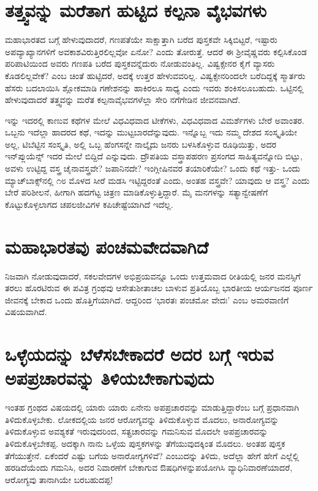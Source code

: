 \section*{ತತ್ತ್ವವನ್ನು ಮರೆತಾಗ ಹುಟ್ಟಿದ ಕಲ್ಪನಾ ವೈಭವಗಳು}

ಮಹಾಭಾರತದ ಬಗ್ಗೆ ಹೇಳುವುದಾದರೆ, ಗಣಪತೆಯೇ ಸಾಕ್ಷಾತ್ತಾಗಿ ಬರೆದ ಪುಸ್ತಕವೇ ಸಿಕ್ಕಿಬಿಟ್ಟರೆ, ಇಷ್ಟಾರು ಅಪವ್ಯಾಖ್ಯಾನಗಳಿಗೆ ಅವಕಾಶವಿರುತ್ತಿರಲಿಲ್ಲವೋ ಏನೋ? ಎಂದು ತೋರುತ್ತೆ. ಆದರೆ ಈ ಶ್ರೀವೈಷ್ಣವರು ಕಲ್ಪಿಸಿಕೊಂಡ ಪರಿಪಾಟಿಯಿಂದ ಅವರು ಗಣಪತಿ ಬರೆದ ಪುಸ್ತಕವನ್ನೆದುರು ನೋಡುವಂತಿಲ್ಲ. ವಿಷ್ವಕ್ಸೇನರ ಕೈಗೆ ವ್ಯಾಸರು ಕೊಡಲಿಲ್ಲವೇಕೆ? ಎಂಬ ಚಿಂತೆ ಹುಟ್ಟಿದರೆ, ಅದಕ್ಕೆ ಉತ್ತರ ಹೇಳುವವರಿಲ್ಲ. ವಿಷ್ವಕ್ಸೇನರಿಂದಲೇ ಬರೆದಿದ್ದಕ್ಕೆ ಸ್ಮಾರ್ತರು ಹೆಸರು ಬದಲಾಯಿಸಿ ಶ್ಲೋಕಮಾಡಿ ಗಣೇಶನನ್ನು ಹಾಕಿರಲೂ ಸಾಧ್ಯ ಎಂದು ಇವರು ಶಂಕಿಸಲೂಬಹುದು. ಒಟ್ಟಿನಲ್ಲಿ ಹೇಳುವುದಾದರೆ ತತ್ತ್ವವನ್ನು ಮರೆತ ಕಲ್ಪನಾವೈಭವಗಳೆಲ್ಲಾ ಸೇರಿ ನಗೆಗೇಡಿನ ಜೀವನವಾಗಿದೆ.

ಇನ್ನು ಇದರಲ್ಲಿ ಕಾಣುವ ಕಥೆಗಳ ಮೇಲೆ ವಿಧವಿಧವಾದ ಟೀಕೆಗಳು, ವಿಧವಿಧವಾದ ವಿಮರ್ಶೆಗಳು ಬೇರೆ ಅವಾಂತರ. ಒಬ್ಬನು ಇದೆಲ್ಲಾ ಹಾದರದ ಕಥೆ, ಇದನ್ನು ಮುಟ್ಟಬಾರದೆನ್ನುವುದು. ಇನ್ನೊಬ್ಬ ಇದು ನಮ್ಮ ದೇಶದ ಸಂಸ್ಕೃತಿಯೇ ಅಲ್ಲ, ಟಿಬೆಟ್ಟಿನ ಸಂಸ್ಕೃತಿ, ಅಲ್ಲಿ ಒಬ್ಬ ಹೆಂಗಸನ್ನೇ ನಾಲ್ಕೈದು ಜನರು ಬಳಸಿಕೊಳ್ಳುವ ರೂಢಿಯಿತ್ತು, ಅದರ ಇನ್‌ಪ್ಲುಯೆನ್ಸ್ ಇದರ ಮೇಲೆ ಬಿದ್ದಿದೆ ಎನ್ನುವುದು. ದ್ರೌಪತಿಯ ವಸ್ತ್ರಾಪಹರಣ ಪ್ರಸಂಗದ ಸಾಹಿತ್ಯವನ್ನೋದಿ ಬಿಟ್ಟು, ಅವಳು ಉಟ್ಟಿದ್ದ ವಸ್ತ್ರ ಚೈನಾವಸ್ತ್ರವೇ? ಜಪಾನಿನದೇ? ಇಂಗ್ಲೀಷಿನವರ ತಯಾರಿಕೆಯೇ? ಒಂದು ಕಥೆ ಇತ್ತು- ಒಂದು ಮ್ಯಾಚ್‌ಬಾಕ್ಸ್‌ನಲ್ಲಿ ೧೮ ಮೊಳದ ಸೀರೆ ಮಡಸಿ ಇಟ್ಟಿದ್ದರಂತೆ ಎಂದು, ಅಂತಹ ವಸ್ತ್ರವೇ? ಯಾವುದು ಆ ವಸ್ತ್ರ? ಎಂದು ಬೇರೆ ಪರಿಶೀಲನೆ, ಹೀಗಾಗಿ ಹದಗೆಟ್ಟ ಚಿತ್ರಣ ಮಾಡಿಕೊಳ್ಳುತ್ತಿದ್ದಾರೆ. ಮೈ ಮನಗಳನ್ನು ಸತ್ಯಾನ್ವೇಷಣೆಗೆ ಕೊಟ್ಟುಕೊಳ್ಳಲಾಗದ ಚಪಲಜೀವಿಗಳ ಕಪಿಚೇಷ್ಟೆಯಾಗಿದೆ ಇದೆಲ್ಲ.

\section*{ಮಹಾಭಾರತವು ಪಂಚಮವೇದವಾಗಿದೆ}

ನಿಜವಾಗಿ ನೋಡುವುದಾದರೆ, ಸಕಲವೇದಗಳ ಅಭಿಪ್ರಯವನ್ನೂ ಒಂದು ಉತ್ತಮವಾದ ರೀತಿಯಲ್ಲಿ ಜನರ ಮನಸ್ಸಿಗೆ ತರಲು ಹೊರಟಿರುವ ಈ ಪವಿತ್ರ ಗ್ರಂಥವು ಆಸೇತುಶೀತಾಚಲ ಬಾಳುವ ಪ್ರತಿಯೊಬ್ಬ ಭಾರತೀಯ ಆರ್ಯಜನದ ಪೂರ್ಣ ಜೀವನಕ್ಕೆ ಬೇಕಾದ ಒಂದು ಹೊತ್ತಿಗೆಯಾಗಿದೆ. ಆದ್ದರಿಂದ `ಭಾರತಃ ಪಂಚಮೋ ವೇದಃ' ಎಂಬ ಅಮರವಾಣಿಗೆ ವಿಷಯವಾಗಿದೆ.

\section*{ಒಳ್ಳೆಯದನ್ನು ಬೆಳೆಸಬೇಕಾದರೆ ಅದರ ಬಗ್ಗೆ ಇರುವ ಅಪಪ್ರಚಾರವನ್ನು ತಿಳಿಯಬೇಕಾಗುವುದು}

ಇಂತಹ ಗ್ರಂಥದ ವಿಷಯದಲ್ಲಿ ಯಾರು ಯಾರು ಏನೇನು ಅಪಪ್ರಚಾರವನ್ನು ಮಾಡುತ್ತಿದ್ದಾರೆಂಬ ಬಗ್ಗೆ ಪ್ರಧಾನವಾಗಿ ತಿಳಿದುಕೊಳ್ಳಬೇಕು. ಲೋಕದಲ್ಲಿಯ ಜನರ ಆರೋಗ್ಯವನ್ನು ತಿಳಿದುಕೊಳ್ಳುವ ಮೊದಲು, ಅನಾರೋಗ್ಯವನ್ನು ತಿಳಿದುಕೊಳ್ಳುವ ಅವಶ್ಯಕತೆ ಇರುವುದರಿಂದ, ಸತ್ಪ್ರಚಾರವನ್ನು ಗಮನಿಸುವ ಮೊದಲೇ ಅಪಪ್ರಚಾರವನ್ನು ತಿಳಿದುಕೊಳ್ಳಬೇಕಪ್ಪ. ಅದಕ್ಕಾಗಿ ನಾನು ಒಳ್ಳೆಯ ಪುಸ್ತಕಗಳನ್ನು ತೆಗೆಯುವುದಕ್ಕಿಂತ ಮೊದಲು. ಅಂತಹ ಪುಸ್ತಕ ತೆಗೆಯುತ್ತೇನೆ. ಏಕೆಂದರೆ ಎಷ್ಟು ಬಗೆಯ ಅನಾರೋಗ್ಯಗಳಿವೆ? ಎಂಬುದನ್ನು ತಿಳಿದು, ಅದೆಲ್ಲಾ ಹೇಗೆ ಹೇಗೆ ಎಲ್ಲೆಲ್ಲಿ ಹರಡಿದೆಯೆಂದು ಗಮನಿಸಿ, ಅದರ ನಿವಾರಣೆಗೆ ಬೇಕಾಗುವ ಔಷಧಿಗಳನ್ನುಪಯೋಗಿಸಿ ವ್ಯಾಧಿನಿವಾರಣೆಯಾದರೆ, ಆರೋಗ್ಯವು ತಾನಾಗಿಯೇ ಬರಬಹುದಪ್ಪ!

